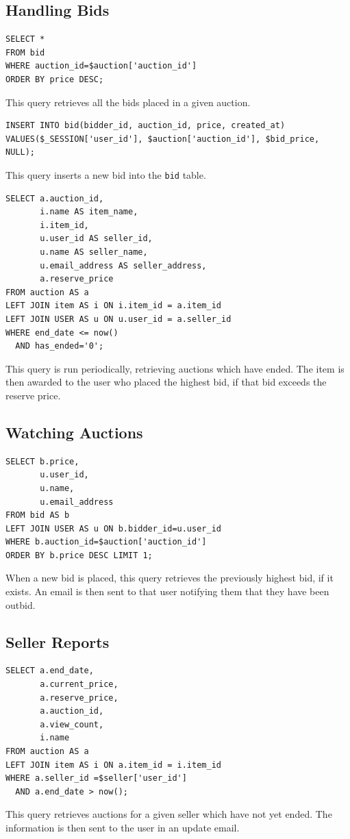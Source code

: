 \documentclass{article}
\begin{document}
\subsection{Handling Bids}
\begin{verbatim}
SELECT *
FROM bid
WHERE auction_id=$auction['auction_id']
ORDER BY price DESC;
\end{verbatim}
This query retrieves all the bids placed in a given auction.

\begin{verbatim}
INSERT INTO bid(bidder_id, auction_id, price, created_at)
VALUES($_SESSION['user_id'], $auction['auction_id'], $bid_price, NULL);
\end{verbatim}
This query inserts a new bid into the \texttt{bid} table.

\begin{verbatim}
SELECT a.auction_id,
       i.name AS item_name,
       i.item_id,
       u.user_id AS seller_id,
       u.name AS seller_name,
       u.email_address AS seller_address,
       a.reserve_price
FROM auction AS a
LEFT JOIN item AS i ON i.item_id = a.item_id
LEFT JOIN USER AS u ON u.user_id = a.seller_id
WHERE end_date <= now()
  AND has_ended='0';
\end{verbatim}
This query is run periodically, retrieving auctions which have ended. The item is then awarded to the user who placed the highest bid, if that bid exceeds the reserve price.

\subsection{Watching Auctions}
\begin{verbatim}
SELECT b.price,
       u.user_id,
       u.name,
       u.email_address
FROM bid AS b
LEFT JOIN USER AS u ON b.bidder_id=u.user_id
WHERE b.auction_id=$auction['auction_id']
ORDER BY b.price DESC LIMIT 1;
\end{verbatim}
When a new bid is placed, this query retrieves the previously highest bid, if it exists. An email is then sent to that user notifying them that they have been outbid.

\subsection{Seller Reports}
\begin{verbatim}
SELECT a.end_date,
       a.current_price,
       a.reserve_price,
       a.auction_id,
       a.view_count,
       i.name
FROM auction AS a
LEFT JOIN item AS i ON a.item_id = i.item_id
WHERE a.seller_id =$seller['user_id']
  AND a.end_date > now();
\end{verbatim}
This query retrieves auctions for a given seller which have not yet ended. The information is then sent to the user in an update email.
\end{document}
